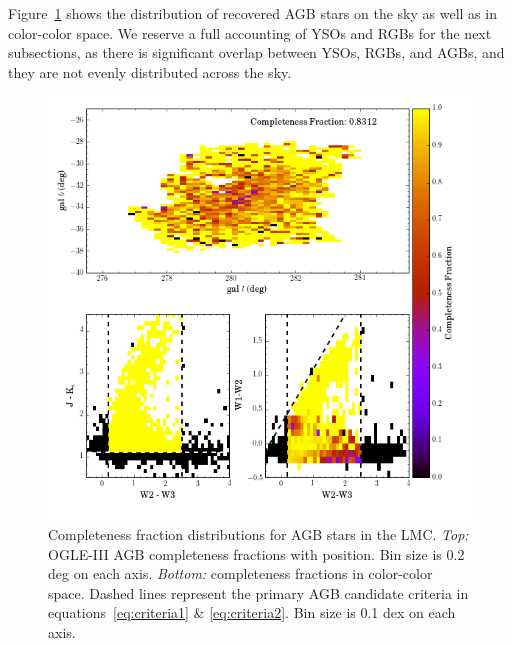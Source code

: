 \begin{table}[h]
	\begin{center}
	\caption{Sample contamination and completeness (\emph{bold}) with respect to each successive cut on WISE-2MASS color.\label{tab:criteria_completeness_contamination}}
	\end{center}
\end{table}

Figure~\ref{fig:lmc_completeness} shows the distribution of recovered AGB stars on the sky as well as in color-color space. We reserve a full accounting of YSOs and RGBs for the next subsections, as there is significant overlap between YSOs, RGBs, and AGBs, and they are not evenly distributed across the sky.

\begin{figure}[h]
\includegraphics[width=6in]{figs/ogle_completeness_map.png}
\caption{Completeness fraction distributions for AGB stars in the LMC. \emph{Top:} OGLE-III AGB completeness fractions with position. Bin size is 0.2 deg on each axis. \emph{Bottom:} completeness  fractions in color-color space. Dashed lines represent the primary AGB candidate criteria in equations~\ref{eq:criteria1} \& \ref{eq:criteria2}. Bin size is 0.1 dex on each axis. \label{fig:lmc_completeness}}
\end{figure}

